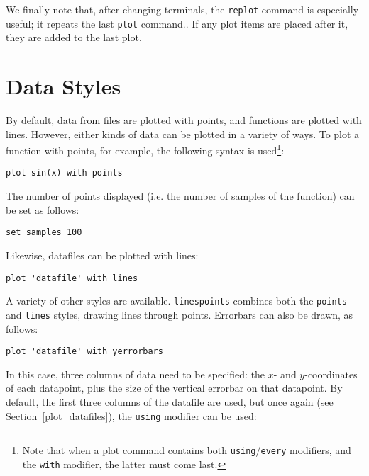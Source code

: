We finally note that, after changing terminals, the \texttt{replot} command is
especially useful; it repeats the last \texttt{plot} command.. If any plot items are placed after it, they
are added to the last plot.

\section{Data Styles}

By default, data from files are plotted with points, and functions are plotted
with lines. However, either kinds of data can be plotted in a variety of ways.
To plot a function with points, for example, the following syntax is
used\footnote{Note that when a plot command contains both
\texttt{using}/\texttt{every} modifiers, and the \texttt{with} modifier, the
latter must come last.}:

\begin{verbatim}
plot sin(x) with points
\end{verbatim}

\noindent The number of points displayed (i.e. the number of samples of the
function) can be set as follows:

\begin{verbatim}
set samples 100
\end{verbatim}

Likewise, datafiles can be plotted with lines:

\begin{verbatim}
plot 'datafile' with lines
\end{verbatim}

A variety of other styles are available. \texttt{linespoints} combines both the
\texttt{points} and \texttt{lines} styles, drawing lines through points.
Errorbars can also be drawn, as follows:

\begin{verbatim}
plot 'datafile' with yerrorbars
\end{verbatim}

\noindent In this case, three columns of data need to be specified: the $x$-
and $y$-coordinates of each datapoint, plus the size of the vertical errorbar
on that datapoint. By default, the first three columns of the datafile are
used, but once again (see Section~\ref{plot_datafiles}), the \texttt{using}
modifier can be used:

